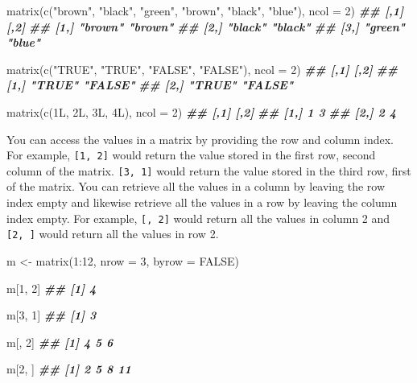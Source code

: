 \documentclass[
]{book}
\newenvironment{Shaded}{\begin{snugshade}}{\end{snugshade}}
\newcommand{\AttributeTok}[1]{\textcolor[rgb]{0.77,0.63,0.00}{#1}}
\newcommand{\ConstantTok}[1]{\textcolor[rgb]{0.00,0.00,0.00}{#1}}
\newcommand{\DecValTok}[1]{\textcolor[rgb]{0.00,0.00,0.81}{#1}}
\newcommand{\DocumentationTok}[1]{\textcolor[rgb]{0.56,0.35,0.01}{\textbf{\textit{#1}}}}
\newcommand{\FunctionTok}[1]{\textcolor[rgb]{0.00,0.00,0.00}{#1}}
\newcommand{\NormalTok}[1]{#1}
\newcommand{\OtherTok}[1]{\textcolor[rgb]{0.56,0.35,0.01}{#1}}
\newcommand{\SpecialCharTok}[1]{\textcolor[rgb]{0.00,0.00,0.00}{#1}}
\newcommand{\StringTok}[1]{\textcolor[rgb]{0.31,0.60,0.02}{#1}}
\begin{document}
\begin{Shaded}
\begin{Highlighting}[]
\FunctionTok{matrix}\NormalTok{(}\FunctionTok{c}\NormalTok{(}\StringTok{"brown"}\NormalTok{, }\StringTok{"black"}\NormalTok{, }\StringTok{"green"}\NormalTok{, }\StringTok{"brown"}\NormalTok{, }\StringTok{"black"}\NormalTok{, }\StringTok{"blue"}\NormalTok{), }\AttributeTok{ncol =} \DecValTok{2}\NormalTok{)}
\DocumentationTok{\#\#      [,1]    [,2]   }
\DocumentationTok{\#\# [1,] "brown" "brown"}
\DocumentationTok{\#\# [2,] "black" "black"}
\DocumentationTok{\#\# [3,] "green" "blue"}

\FunctionTok{matrix}\NormalTok{(}\FunctionTok{c}\NormalTok{(}\StringTok{"TRUE"}\NormalTok{, }\StringTok{"TRUE"}\NormalTok{, }\StringTok{"FALSE"}\NormalTok{, }\StringTok{"FALSE"}\NormalTok{), }\AttributeTok{ncol =} \DecValTok{2}\NormalTok{)}
\DocumentationTok{\#\#      [,1]   [,2]   }
\DocumentationTok{\#\# [1,] "TRUE" "FALSE"}
\DocumentationTok{\#\# [2,] "TRUE" "FALSE"}

\FunctionTok{matrix}\NormalTok{(}\FunctionTok{c}\NormalTok{(1L, 2L, 3L, 4L), }\AttributeTok{ncol =} \DecValTok{2}\NormalTok{)}
\DocumentationTok{\#\#      [,1] [,2]}
\DocumentationTok{\#\# [1,]    1    3}
\DocumentationTok{\#\# [2,]    2    4}
\end{Highlighting}
\end{Shaded}

You can access the values in a matrix by providing the row and column index. For example, \texttt{{[}1,\ 2{]}} would return the value stored in the first row, second column of the matrix. \texttt{{[}3,\ 1{]}} would return the value stored in the third row, first of the matrix. You can retrieve all the values in a column by leaving the row index empty and likewise retrieve all the values in a row by leaving the column index empty. For example, \texttt{{[},\ 2{]}} would return all the values in column 2 and \texttt{{[}2,\ {]}} would return all the values in row 2.

\begin{Shaded}
\begin{Highlighting}[]
\NormalTok{m }\OtherTok{\textless{}{-}} \FunctionTok{matrix}\NormalTok{(}\DecValTok{1}\SpecialCharTok{:}\DecValTok{12}\NormalTok{, }\AttributeTok{nrow =} \DecValTok{3}\NormalTok{, }\AttributeTok{byrow =} \ConstantTok{FALSE}\NormalTok{)}

\NormalTok{m[}\DecValTok{1}\NormalTok{, }\DecValTok{2}\NormalTok{]}
\DocumentationTok{\#\# [1] 4}

\NormalTok{m[}\DecValTok{3}\NormalTok{, }\DecValTok{1}\NormalTok{]}
\DocumentationTok{\#\# [1] 3}

\NormalTok{m[, }\DecValTok{2}\NormalTok{]}
\DocumentationTok{\#\# [1] 4 5 6}

\NormalTok{m[}\DecValTok{2}\NormalTok{, ]}
\DocumentationTok{\#\# [1]  2  5  8 11}
\end{Highlighting}
\end{Shaded}
\end{document}
